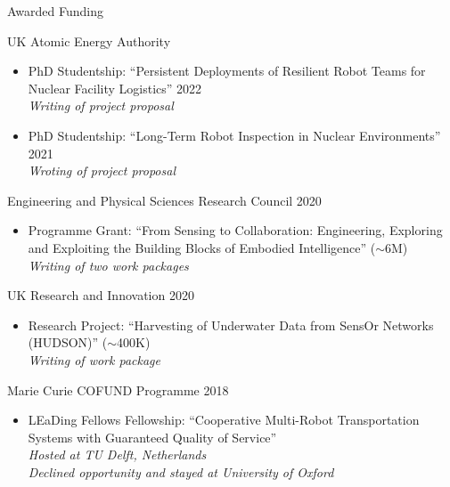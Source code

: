 
\begin{rSection}{Awarded Funding}


\item UK Atomic Energy Authority
\begin{itemize}
\item PhD Studentship: ``Persistent Deployments of Resilient Robot Teams for \\ Nuclear Facility Logistics'' \hfill 2022\\
\textit{Writing of project proposal}
\item PhD Studentship: ``Long-Term Robot Inspection in Nuclear Environments'' \hfill 2021\\
\textit{Wroting of project proposal}
\end{itemize}

\item Engineering and Physical Sciences Research Council \hfill 2020
\begin{itemize}
\item Programme Grant: ``From Sensing to Collaboration: Engineering, Exploring \\ and Exploiting the Building Blocks of Embodied Intelligence'' ($\sim$\textsterling 6M)\\
 \textit{Writing of two work packages}
\end{itemize}

\item UK Research and Innovation \hfill 2020
\begin{itemize}
\item Research Project: ``Harvesting of Underwater Data from SensOr Networks \\ (HUDSON)'' ($\sim$\textsterling 400K)\\
\textit{ Writing of work package}
\end{itemize}

\item Marie Curie COFUND Programme \hfill 2018
\begin{itemize}
\item LEaDing Fellows Fellowship: ``Cooperative Multi-Robot Transportation \\ Systems with Guaranteed Quality of Service''\\
\textit{Hosted at TU Delft, Netherlands}\\
\textit{ Declined opportunity and stayed at University of Oxford}
\end{itemize}


\end{rSection}
